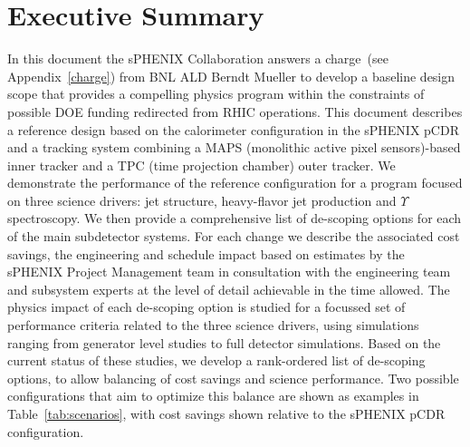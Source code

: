 \section*{Executive Summary}
\label{executive_summary}
\setcounter{page}{1}

\nocite{*}

In this document the sPHENIX Collaboration answers a charge~(see
Appendix~\ref{charge}) from BNL ALD Berndt Mueller to develop a
baseline design scope that provides a compelling physics program
within the constraints of possible DOE funding redirected from RHIC
operations. This document describes a reference design based on the
calorimeter configuration in the sPHENIX pCDR and a tracking system
combining a MAPS (monolithic active pixel sensors)-based inner tracker
and a TPC (time projection chamber) outer tracker. We demonstrate the
performance of the reference configuration for a program focused on
three science drivers: jet structure, heavy-flavor jet production and
$\Upsilon$ spectroscopy.  We then provide a comprehensive list of
de-scoping options for each of the main subdetector systems. For each
change we describe the associated cost savings, the engineering and
schedule impact based on estimates by the sPHENIX Project Management
team in consultation with the engineering team and subsystem experts
at the level of detail achievable in the time allowed.  The physics
impact of each de-scoping option is studied for a focussed set of
performance criteria related to the three science drivers, using
simulations ranging from generator level studies to full detector
simulations. Based on the current status of these studies, we develop
a rank-ordered list of de-scoping options, to allow balancing of cost
savings and science performance. Two possible configurations that aim
to optimize this balance are shown as examples in
Table~\ref{tab:scenarios}, with cost savings shown relative to the
sPHENIX pCDR configuration.

